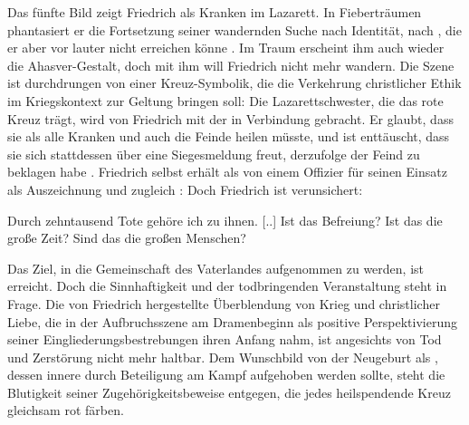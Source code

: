 Das fünfte Bild zeigt Friedrich als Kranken im Lazarett. In Fieberträumen
phantasiert er die Fortsetzung seiner wandernden Suche nach Identität, nach
\Cite{steinigen Gipfeln}, die er aber vor lauter \Cite{Wüste} nicht erreichen
könne . Im Traum erscheint ihm auch wieder die
Ahasver-Gestalt, doch mit ihm
will Friedrich nicht mehr wandern. Die Szene ist durchdrungen von einer
Kreuz-Symbolik, die die Verkehrung christlicher Ethik im Kriegskontext zur
Geltung bringen soll: Die Lazarettschwester, die das rote Kreuz trägt, wird
von Friedrich mit der \Cite{Mutter Gottes} in Verbindung gebracht. Er glaubt,
dass sie als \Cite{Kreuzträgerin, Verkünderin der Liebe} alle Kranken und auch
die Feinde \Cite{draußen} heilen müsste, und ist enttäuscht, dass sie sich
stattdessen über eine Siegesmeldung freut, derzufolge der Feind
\Cite{zehntausend Tote} zu beklagen habe . Friedrich selbst
erhält als
\Cite{Held} von einem Offizier für seinen Einsatz \Cite{das Kreuz} als
Auszeichnung und zugleich \Cite{Bürgerrechte}: \Cite{Sieg stürmt ins
  Land, Sie gehören zu den Siegern.}  Doch Friedrich ist verunsichert:

\begin{BlockQuote}
  Durch zehntausend Tote gehöre ich zu ihnen. [..] Ist das Befreiung? Ist das
  die große Zeit? Sind das die großen Menschen?
\end{BlockQuote}
Das Ziel, in die Gemeinschaft des Vaterlandes aufgenommen zu werden, ist
erreicht. Doch die Sinnhaftigkeit und  der todbringenden
Veranstaltung steht in Frage. Die von Friedrich hergestellte Überblendung von
Krieg und christlicher Liebe, die in der Aufbruchsszene am Dramenbeginn als
positive Perspektivierung seiner Eingliederungsbestrebungen ihren Anfang nahm,
ist angesichts von Tod und Zerstörung nicht mehr haltbar. Dem Wunschbild
von der Neugeburt als \Cite{großer Mensch}, dessen innere
\Cite{Zerrissenheit} durch Beteiligung am \Cite{einenden} Kampf aufgehoben
werden sollte, steht die Blutigkeit seiner Zugehörigkeitsbeweise entgegen, die
jedes heilspendende Kreuz gleichsam rot färben.

\label{TOD}

